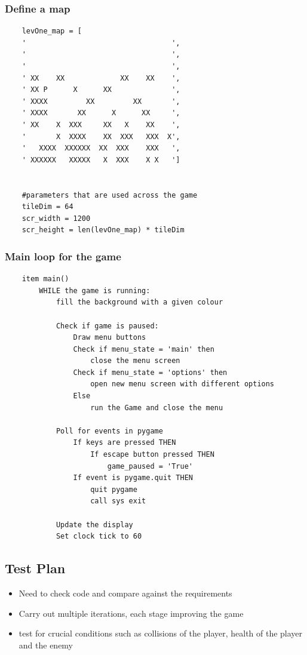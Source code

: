 \documentclass[12pt]{article}
\begin{document}
\subsubsection{Define a map}
\begin{verbatim}
    levOne_map = [
    '                                  ',
    '                                  ',
    '                                  ',
    ' XX    XX             XX    XX    ',
    ' XX P      X      XX              ',
    ' XXXX         XX         XX       ',
    ' XXXX       XX      X      XX     ',
    ' XX    X  XXX     XX   X    XX    ',
    '       X  XXXX    XX  XXX   XXX  X',
    '   XXXX  XXXXXX  XX  XXX    XXX   ',
    ' XXXXXX   XXXXX   X  XXX    X X   ']

    
    #parameters that are used across the game
    tileDim = 64
    scr_width = 1200
    scr_height = len(levOne_map) * tileDim
\end{verbatim}
\subsubsection{Main loop for the game}
\begin{verbatim}
    item main() 
        WHILE the game is running:
            fill the background with a given colour

            Check if game is paused:
                Draw menu buttons
                Check if menu_state = 'main' then
                    close the menu screen
                Check if menu_state = 'options' then
                    open new menu screen with different options
                Else
                    run the Game and close the menu
                
            Poll for events in pygame        
                If keys are pressed THEN
                    If escape button pressed THEN
                        game_paused = 'True'
                If event is pygame.quit THEN
                    quit pygame
                    call sys exit 

            Update the display
            Set clock tick to 60
\end{verbatim}

\subsection{Test Plan}
\begin{itemize}
    \item Need to check code and compare against the requirements
    \item Carry out multiple iterations, each stage improving the game
    \item test for crucial conditions such as collisions of the player, health of the player and the enemy
\end{itemize}
\end{document}
